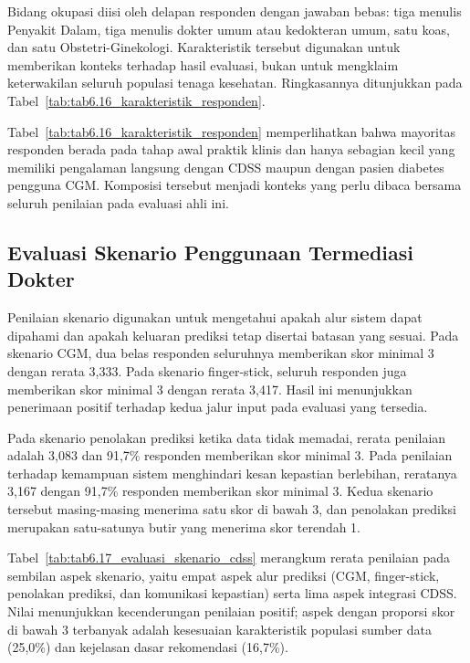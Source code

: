 Bidang okupasi diisi oleh delapan responden dengan jawaban bebas: tiga menulis Penyakit Dalam, tiga menulis dokter umum atau kedokteran umum, satu koas,
dan satu Obstetri-Ginekologi. Karakteristik tersebut digunakan untuk memberikan konteks terhadap hasil evaluasi, bukan untuk mengklaim keterwakilan seluruh populasi tenaga
kesehatan. Ringkasannya ditunjukkan pada Tabel~\ref{tab:tab6.16_karakteristik_responden}.



Tabel~\ref{tab:tab6.16_karakteristik_responden} memperlihatkan bahwa mayoritas responden berada pada tahap awal praktik klinis dan hanya sebagian kecil yang memiliki pengalaman langsung dengan
CDSS maupun dengan pasien diabetes pengguna CGM. Komposisi tersebut menjadi konteks yang perlu dibaca bersama seluruh penilaian pada evaluasi ahli ini.

\subsection{Evaluasi Skenario Penggunaan Termediasi Dokter}
\label{subsec:bab6-evaluasi-skenario-doctor-mediated}

Penilaian skenario digunakan untuk mengetahui apakah alur sistem dapat dipahami dan apakah keluaran prediksi tetap disertai batasan yang sesuai.
Pada skenario CGM, dua belas responden seluruhnya memberikan skor minimal 3 dengan rerata 3,333. Pada skenario finger-stick, seluruh responden juga
memberikan skor minimal 3 dengan rerata 3,417. Hasil ini menunjukkan penerimaan positif terhadap kedua jalur input pada evaluasi yang tersedia.

Pada skenario penolakan prediksi ketika data tidak memadai, rerata penilaian adalah 3,083 dan 91,7\% responden memberikan skor minimal 3. Pada penilaian
terhadap kemampuan sistem menghindari kesan kepastian berlebihan, reratanya 3,167 dengan 91,7\% responden memberikan skor minimal 3. Kedua skenario tersebut
masing-masing menerima satu skor di bawah 3, dan penolakan prediksi merupakan satu-satunya butir yang menerima skor terendah 1.



Tabel~\ref{tab:tab6.17_evaluasi_skenario_cdss} merangkum rerata penilaian pada sembilan aspek skenario, yaitu empat aspek alur prediksi (CGM,
finger-stick, penolakan prediksi, dan komunikasi kepastian) serta lima aspek integrasi CDSS. Nilai menunjukkan kecenderungan penilaian positif; aspek
dengan proporsi skor di bawah 3 terbanyak adalah kesesuaian karakteristik populasi sumber data (25,0\%) dan kejelasan dasar rekomendasi (16,7\%).

